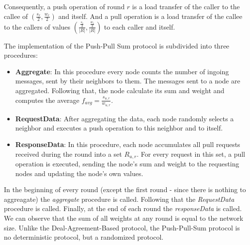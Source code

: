 Consequently, a push operation of round $r$ is a load transfer of the caller to the callee of $\left(\frac{s_{r}}{2}, \frac{w_{r}}{2}\right)$ and itself. And a pull operation is a load transfer of the callee to the callers of values $\left(\frac{\frac{s_{r}}{2}}{|R|}, \frac{\frac{w_{r}}{2}}{|R|}\right)$ to each caller and itself.

The implementation of the Push-Pull Sum protocol is subdivided into three procedures:
\begin{itemize}
    \item \textbf{Aggregate}: In this procedure every node counts the number of ingoing messages, sent by their neighbors to them. The messages sent to a node are aggregated. Following that, the node calculate its sum and weight and computes the average $f_{avg} = \frac{s_{u, r}}{w_{u, r}}$.
    \item \textbf{RequestData}: After aggregating the data, each node randomly selects a neighbor and executes a push operation to this neighbor and to itself.
    \item \textbf{ResponseData}: In this procedure, each node accumulates all pull requests received during the round into a set $R_{u, r}$. For every request in this set, a pull operation is executed, sending the node's sum and weight to the requesting nodes and updating the node's own values.
\end{itemize}
In the beginning of every round (except the first round - since there is nothing to aggreagate) the \textit{aggregate} procedure is called. Following that the \textit{RequestData} procedure is called. Finally, at the end of each round the \textit{responseData} is called. We can observe that the sum of all weights at any round is equal to the network size. Unlike the Deal-Agreement-Based protocol, the Push-Pull-Sum protocol is no deterministic protocol, but a randomized protocol.